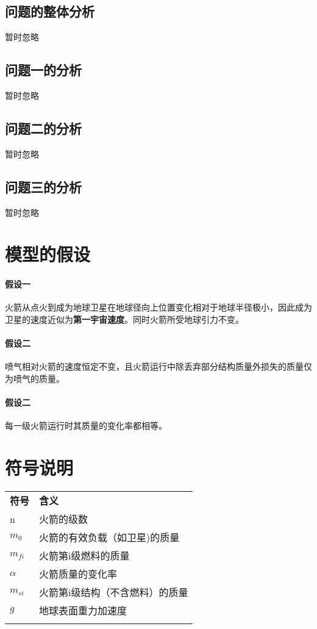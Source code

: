 \documentclass{JXUSTmodeling}
\begin{document}
\subsection{问题的整体分析}\label{sub:2.1}
暂时忽略
\subsection{问题一的分析}\label{sub:2.2}
暂时忽略
\subsection{问题二的分析}\label{sub:2.3}
暂时忽略
\subsection{问题三的分析}\label{sub:2.4}
暂时忽略
\section{模型的假设}\label{sec:3}
\paragraph{假设一}火箭从点火到成为地球卫星在地球径向上位置变化相对于地球半径极小，因此成为卫星的速度近似为{\bfseries 第一宇宙速度}。同时火箭所受地球引力不变。
\paragraph{假设二}喷气相对火箭的速度恒定不变，且火箭运行中除丢弃部分结构质量外损失的质量仅为喷气的质量。
\paragraph{假设二}每一级火箭运行时其质量的变化率都相等。
\section{符号说明}\label{sec:4}
\begin{table}[htbp]
    \centering
    \begin{tabularx}{\textwidth}{Y|Y}
    \Xhline{0.08em}
      {\bfseries 符号} & {\bfseries 含义}\\
      \Xhline{0.05em}
      n & 火箭的级数\\
      \Xhline{0.05em}
      $m_0$ & 火箭的有效负载（如卫星)的质量\\
      \Xhline{0.05em}
      $m_{fi}$ & 火箭第i级燃料的质量\\
      \Xhline{0.05em}
      $\alpha$ & 火箭质量的变化率\\
      \Xhline{0.05em}
      $m_{si}$ & 火箭第i级结构（不含燃料）的质量\\
      \Xhline{0.05em}
      $g$ & 地球表面重力加速度\\
      \Xhline{0.08em}
    \end{tabularx}
  \end{table}
\end{document}
